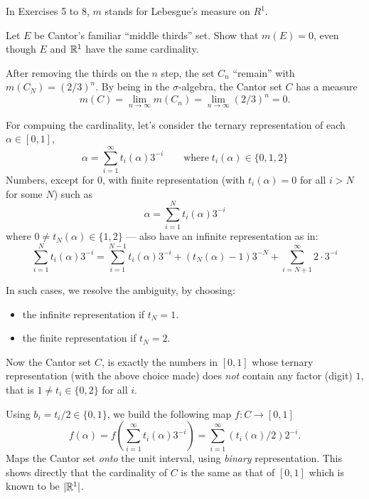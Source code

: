 In Exercises 5 to 8, $m$ stands for Lebesgue's measure on \(R^1\).
\nobreak
\begin{enumerate}

\setcounter{enumi}{4}

\begin{excopy}
Let $E$ be
Cantor's familiar ``middle thirds'' set.
Show that \(m(E) = 0\), even though $E$ and \(\mathbb{R}^1\) have the same cardinality.
\end{excopy}

After removing the thirds on the $n$ step, the set \(C_n\) ``remain'' with
\(m(C_N) = (2/3)^n\). By being in the \(\sigma\)-algebra,
the Cantor set $C$ has a measure
\begin{equation*}
m(C) =
\lim_{n\rightarrow\infty}m(C_n) = \lim_{n\rightarrow\infty}(2/3)^n = 0.
\end{equation*}

For compuing the cardinality, let's consider the ternary representation
of each \(\alpha\in [0,1]\),
\begin{equation*}
 \alpha = \sum_{i=1}^\infty t_i(\alpha) 3^{-i}
    \qquad \textrm{where}\; t_i(\alpha) \in \{0,1,2\}
\end{equation*}
Numbers, except for $0$,  with finite representation
(with \(t_i(\alpha)=0\) for all \(i > N\) for some $N$)
such as
\begin{equation*}
\alpha = \sum_{i=1}^N t_i(\alpha) 3^{-i}
\end{equation*}
where \(0\neq t_N(\alpha) \in \{1,2\}\) ---
also have an infinite representation as in:
\begin{equation*}
\sum_{i=1}^N t_i(\alpha) 3^{-i} =
\sum_{i=1}^{N-1} t_i(\alpha) 3^{-i}
+ (t_N(\alpha)-1) 3^{-N}
+ \sum_{i=N+1}^\infty 2\cdot 3^{-i}
\end{equation*}

In such cases,
we resolve the ambiguity, by choosing:
\begin{itemize}
 \item the infinite representation if \(t_N = 1\).
 \item the finite representation if \(t_N = 2\).
\end{itemize}

Now the Cantor set $C$, is exactly the numbers in \([0,1]\)
whose ternary representation (with the above choice made)
does \emph{not} contain any factor (digit) $1$, that is
\(1 \neq t_i\in \{0,2\}\) for all $i$.

Using \(b_i=t_i/2\in \{0,1\}\), we build
 the following map \(f:C\rightarrow [0,1]\)
\begin{equation*}
f(\alpha)
  = f\left(\sum_{i=1}^\infty t_i(\alpha) 3^{-i} \right)
  = \sum_{i=1}^\infty (t_i(\alpha)/2) 2^{-i}.
\end{equation*}
Maps the Cantor set \emph{onto} the unit interval, using \emph{binary}
representation. This shows directly that the cardinality of $C$ is
the same as that of \([0,1]\) which is known to be \(|\mathbb{R}^1|\).


\end{enumerate}
